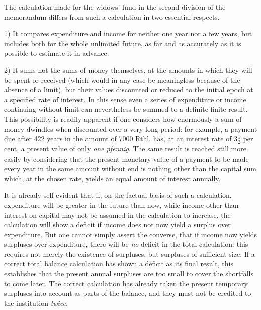 The calculation made for the widows' fund in the second division of the memorandum differs from such a calculation in two essential respects.

1) It compares expenditure and income for neither one year nor a few years, but includes both for the whole unlimited future, as far and as accurately as it is possible to estimate it in advance.

2) It sums not the sums of money themselves, at the amounts in which they will be spent or received (which would in any case be meaningless because of the absence of a limit), but their values discounted or reduced to the initial epoch at a specified rate of interest. In this sense even a series of expenditure or income continuing without limit can nevertheless be summed to a definite finite result. This possibility is readily apparent if one considers how enormously a sum of money dwindles when discounted over a very long period: for example, a payment due after 422 years in the amount of 7000 Rthl. has, at an interest rate of \(3\tfrac{1}{2}\) per cent, a present value of only \textit{one pfennig}. The same result is reached still more easily by considering that the present monetary value of a payment to be made every year in the same amount without end is nothing other than the capital sum which, at the chosen rate, yields an equal amount of interest annually.

It is already self-evident that if, on the factual basis of such a calculation, expenditure will be greater in the future than now, while income other than interest on capital may not be assumed in the calculation to increase, the calculation will show a deficit if income does not now yield a surplus over expenditure. But one cannot simply assert the converse, that if income now yields surpluses over expenditure, there will be \textit{no} deficit in the total calculation: this requires not merely the existence of surpluses, but surpluses of sufficient size. If a correct total balance calculation has shown a deficit as its final result, this establishes that the present annual surpluses are too small to cover the shortfalls to come later. The correct calculation has already taken the present temporary surpluses into account as parts of the balance, and they must not be credited to the institution \textit{twice}.

